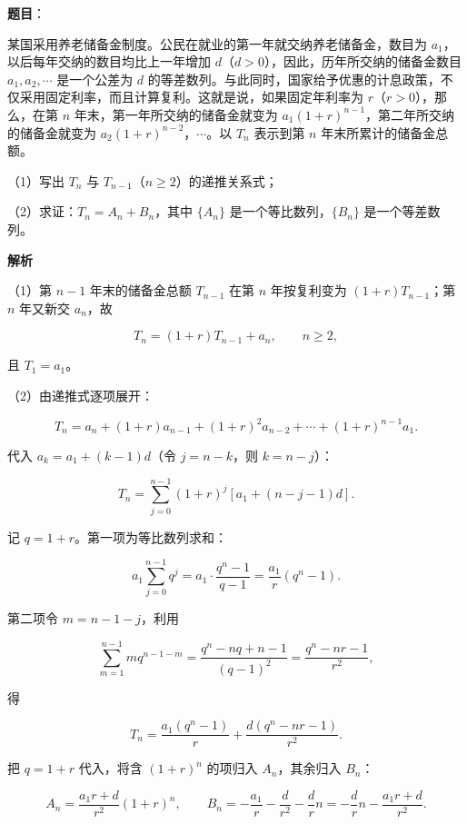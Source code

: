 \begin{answer}

\textbf{题目}：

某国采用养老储备金制度。公民在就业的第一年就交纳养老储备金，数目为 $a_1$，以后每年交纳的数目均比上一年增加 $d$（$d>0$），因此，历年所交纳的储备金数目 $a_1,a_2,\cdots$ 是一个公差为 $d$ 的等差数列。与此同时，国家给予优惠的计息政策，不仅采用固定利率，而且计算复利。这就是说，如果固定年利率为 $r$（$r>0$），那么，在第 $n$ 年末，第一年所交纳的储备金就变为 $a_1(1+r)^{n-1}$，第二年所交纳的储备金就变为 $a_2(1+r)^{n-2}$，$\cdots$。以 $T_n$ 表示到第 $n$ 年末所累计的储备金总额。

（1）写出 $T_n$ 与 $T_{n-1}$（$n\geqslant2$）的递推关系式；

（2）求证：$T_n=A_n+B_n$，其中 $\{A_n\}$ 是一个等比数列，$\{B_n\}$ 是一个等差数列。

\textbf{解析}

（1）第 $n-1$ 年末的储备金总额 $T_{n-1}$ 在第 $n$ 年按复利变为 $(1+r)T_{n-1}$；第 $n$ 年又新交 $a_n$，故

\nopagebreak[4]
\[T_n=(1+r)T_{n-1}+a_n,\qquad n\geqslant2,\]

且 $T_1=a_1$。

（2）由递推式逐项展开：

\nopagebreak[4]
\[T_n=a_n+(1+r)a_{n-1}+(1+r)^2a_{n-2}+\cdots+(1+r)^{n-1}a_1.\]

代入 $a_k=a_1+(k-1)d$（令 $j=n-k$，则 $k=n-j$）：

\nopagebreak[4]
\[T_n=\sum_{j=0}^{n-1}(1+r)^j\left[a_1+(n-j-1)d\right].\]

记 $q=1+r$。第一项为等比数列求和：

\nopagebreak[4]
\[a_1\sum_{j=0}^{n-1}q^j=a_1\cdot\frac{q^n-1}{q-1}=\frac{a_1}{r}(q^n-1).\]

第二项令 $m=n-1-j$，利用

\nopagebreak[4]
\[\sum_{m=1}^{n-1}mq^{n-1-m}=\frac{q^n-nq+n-1}{(q-1)^2}=\frac{q^n-nr-1}{r^2},\]

得

\nopagebreak[4]
\[T_n=\frac{a_1(q^n-1)}{r}+\frac{d\left(q^n-nr-1\right)}{r^2}.\]

把 $q=1+r$ 代入，将含 $(1+r)^n$ 的项归入 $A_n$，其余归入 $B_n$：

\nopagebreak[4]
\[A_n=\frac{a_1r+d}{r^2}(1+r)^n,\qquad B_n=-\frac{a_1}{r}-\frac{d}{r^2}-\frac drn=-\frac drn-\frac{a_1r+d}{r^2}.\]


\end{answer}
